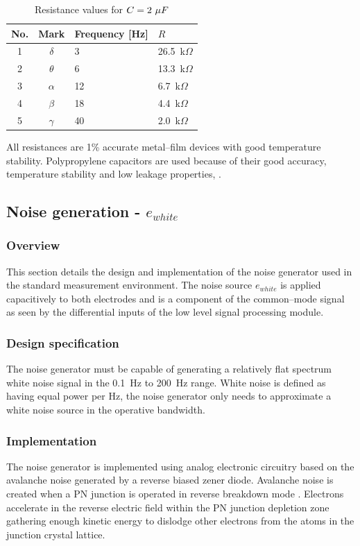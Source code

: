 \begin{table}
\begin{center}	
	\begin{tabular}[htpb]{|c|c|l|l|} \hline
	No. & Mark & Frequency [Hz]  & $R$  \\ \hline
	1 & $\delta$ & 3 & 26.5~k$\Omega$ \\
	2 & $\theta$ & 6 & 13.3~k$\Omega$ \\
	3 & $\alpha$ & 12 & 6.7~k$\Omega$ \\
	4 & $\beta$ & 18 & 4.4~k$\Omega$ \\
	5 & $\gamma$ & 40 & 2.0~k$\Omega$ \\
	\hline
	\end{tabular}
	\caption{Resistance values for $C=2~\mu\/F$}
	\label{table:r-c}
\end{center}	
\end{table}

All resistances are 1\% accurate metal--film devices with good
temperature stability. Polypropylene capacitors are used because of
their good accuracy, temperature stability and low leakage properties,
\cite[p22]{art}.


\subsection{Noise generation - $e_{white}$}
\label{section:noise}
\subsubsection{Overview}
This section details the design and implementation of the noise
generator used in the standard measurement environment. The noise
source $e_{white}$ is applied capacitively to both electrodes and is a
component of the common--mode signal as seen by the differential
inputs of the low level signal processing module.


\subsubsection{Design specification}
The noise generator must be capable of generating a relatively flat
spectrum white noise signal in the 0.1~Hz to 200~Hz range. White noise
is defined as having equal power per Hz, the noise generator only
needs to approximate a white noise source in the operative bandwidth.


\subsubsection{Implementation}
The noise generator is implemented using analog electronic circuitry
based on the avalanche noise generated by a reverse biased zener
diode. Avalanche noise is created when a PN junction is operated in
reverse breakdown mode \cite[p3]{noise-analysis}. Electrons accelerate
in the reverse electric field within the PN junction depletion zone
gathering enough kinetic energy to dislodge other electrons from the
atoms in the junction crystal lattice.

